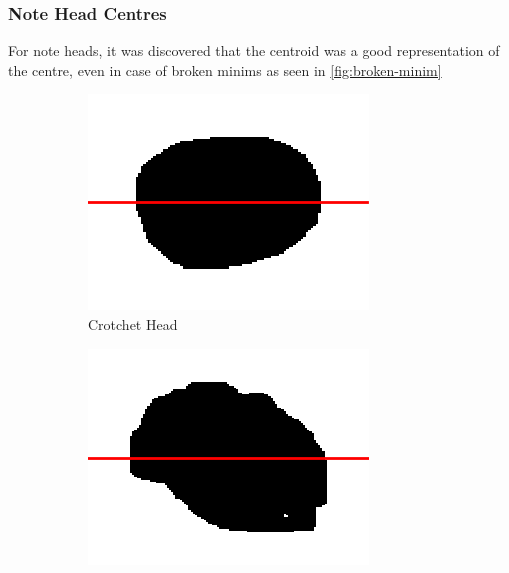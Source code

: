\subsubsection{Note Head Centres}

For note heads, it was discovered that the centroid was a good representation of the centre, even in case of broken minims as seen in \cref{fig:broken-minim}

\begin{figure}[H]
    \centering
    \begin{subfigure}[b]{.32\linewidth}
        \centering
        \includegraphics[width=\linewidth]{gfx/techniques/scoring/note-head/1906-centroid-centre.png}
        \caption{Crotchet Head}
    \end{subfigure}
    \begin{subfigure}[b]{.32\linewidth}
        \centering
        \includegraphics[width=\linewidth]{gfx/techniques/scoring/note-head/6189-centroid-centre.png}

\end{subfigure}
\end{figure}
